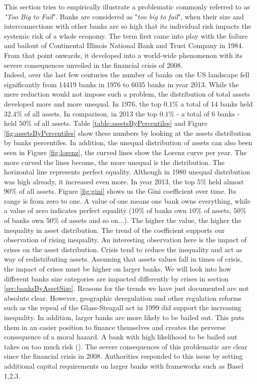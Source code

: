 \documentclass[12pt, a4paper]{article} %
\begin{document}
This section tries to empirically illustrate a problematic commonly referred to as \textit{"Too Big to Fail}". 
Banks are considered as "\textit{too big to fail}", when their size and interconnections with other banks are so high that its individual risk impacts the systemic risk of a whole economy. The term first came into play with the failure and bailout of Continental Illinois National Bank and Trust Company in 1984. From that point onwards, it developed into a world-wide phenomenon with its severe consequences unveiled in the financial crisis of 2008.\\
Indeed, over the last few centuries the number of banks on the US landscape fell significantly from 14419 banks in 1976 to 6035 banks in year 2013. While the mere reduction would not impose such a problem, the distribution of total assets developed more and more unequal. In 1976, the top $0.1\%$ a total of 14 banks held $32.4\%$ of all assets. In comparison, in 2013 the top $0.1\%$ - a total of 6 banks - held $50\%$ of all assets. Table \ref{table:assetsByPercentiles} and Figure \ref{fig:assetsByPercentiles} show these numbers by looking at the assets distribution by banks percentiles. In addition, the unequal distribution of assets can also been seen in Figure \ref{fig:lorenz}, the curved lines show the Lorenz curve per year. The more curved the lines become, the more unequal is the distribution. The horizontal line represents perfect equality. Although in 1980 unequal distribution was high already, it increased even more. In year 2013, the top $5\%$ held almost $90\%$ of all assets. Figure \ref{fig:gini} shows us the Gini coefficient over time. Its range is from zero to one. A value of one means one bank owns everything, while a value of zero indicates perfect equality ($10\%$ of banks own $10\%$ of assets, $50\%$ of banks own $50\%$ of assets and so on...). The higher the value, the higher the inequality in asset distribution. The trend of the coefficient supports our observation of rising inequality. An interesting observation here is the impact of crises on the asset distribution. Crisis tend to reduce the inequality and act as way of redistributing assets. Assuming that assets values fall in times of crisis, the impact of crises must be higher on larger banks. We will look into how different banks size categories are impacted differently by crises in section \ref{sec:banksByAssetSize}.
Reasons for the trends we have just documented are not absolute clear. However, geographic deregulation and other regulation reforms such as the repeal of the Glass-Steagall act in 1999 did support the increasing inequality. In addition, larger banks are more likely to be bailed out. This puts them in an easier position to finance themselves and creates the perverse consequence of a moral hazard. A bank with high likelihood to be bailed out takes on too much risk (\citet{FarhiTirole2012}). The severe consequences of this problematic are clear since the financial crisis in 2008. Authorities responded to this issue by setting additional capital requirements on larger banks with frameworks such as Basel 1,2,3. 
\end{document}
